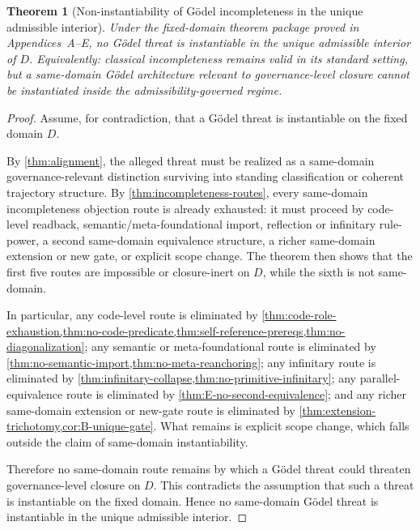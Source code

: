 \documentclass[11pt]{article}
\theoremstyle{plain}
\newtheorem{theorem}{Theorem}[section]
\theoremstyle{definition}
\newcommand{\domain}{D}
\begin{document}
\begin{theorem}[Non-instantiability of G\"odel incompleteness in the unique admissible interior]
\label{thm:main}
Under the fixed-domain theorem package proved in Appendices~A--E, no G\"odel threat is instantiable in the unique admissible interior of $\domain$. Equivalently: classical incompleteness remains valid in its standard setting, but a same-domain G\"odel architecture relevant to governance-level closure cannot be instantiated inside the admissibility-governed regime.
\end{theorem}

\begin{proof}
Assume, for contradiction, that a G\"odel threat is instantiable on the fixed domain $\domain$.

By \cref{thm:alignment}, the alleged threat must be realized as a same-domain governance-relevant distinction surviving into standing classification or coherent trajectory structure. By \cref{thm:incompleteness-routes}, every same-domain incompleteness objection route is already exhausted: it must proceed by code-level readback, semantic/meta-foundational import, reflection or infinitary rule-power, a second same-domain equivalence structure, a richer same-domain extension or new gate, or explicit scope change. The theorem then shows that the first five routes are impossible or closure-inert on $\domain$, while the sixth is not same-domain.

In particular, any code-level route is eliminated by \cref{thm:code-role-exhaustion,thm:no-code-predicate,thm:self-reference-prereqs,thm:no-diagonalization}; any semantic or meta-foundational route is eliminated by \cref{thm:no-semantic-import,thm:no-meta-reanchoring}; any infinitary route is eliminated by \cref{thm:infinitary-collapse,thm:no-primitive-infinitary}; any parallel-equivalence route is eliminated by \cref{thm:E-no-second-equivalence}; and any richer same-domain extension or new-gate route is eliminated by \cref{thm:extension-trichotomy,cor:B-unique-gate}. What remains is explicit scope change, which falls outside the claim of same-domain instantiability.

Therefore no same-domain route remains by which a G\"odel threat could threaten governance-level closure on $\domain$. This contradicts the assumption that such a threat is instantiable on the fixed domain. Hence no same-domain G\"odel threat is instantiable in the unique admissible interior.
\end{proof}
\end{document}
